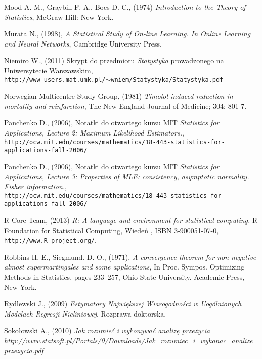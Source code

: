 \begin{thebibliography}{99}
 Mood A. M., Graybill F. A., Boes D. C., (1974) \textit{Introduction to the Theory of Statistics},
McGraw-Hill: New York.

 Murata N., (1998), \textit{A Statistical Study of On-line Learning. In Online Learning
and Neural Networks}, Cambridge University Press.

 Niemiro W., (2011) Skrypt do przedmiotu \textit{Statystyka} prowadzonego na Uniwersytecie Warszawskim, \\ \texttt{http://www-users.mat.umk.pl/$\sim$wniem/Statystyka/Statystyka.pdf}

 Norwegian Multicentre Study Group, (1981) \textit{Timolol-induced reduction in
mortality and reinfarction}, The New England  Journal of Medicine; 304: 801-7.


 Panchenko D., (2006), Notatki do otwartego kursu MIT \textit{Statistics for Applications, Lecture 2: Maximum Likelihood Estimators.}, \\
\texttt{http://ocw.mit.edu/courses/mathematics/18-443-statistics-for-applications-fall-2006/}



 Panchenko D., (2006), Notatki do otwartego kursu MIT \textit{Statistics for Applications, Lecture 3: Properties of MLE: consistency, asymptotic normality. Fisher information.}, \\
\texttt{http://ocw.mit.edu/courses/mathematics/18-443-statistics-for-applications-fall-2006/}



 R Core Team, (2013) \textit{R: A language and environment for statistical computing.} R Foundation for Statistical Computing, Wiedeń , ISBN 3-900051-07-0, \texttt{http://www.R-project.org/}.


 Robbins H. E., Siegmund. D. O., (1971), \textit{A convergence theorem for non negative almost supermartingales
and some applications}, In Proc. Sympos. Optimizing
Methods in Statistics, pages 233–257, Ohio State
University. Academic Press, New York.

 Rydlewski J., (2009) \textit{Estymatory Największej Wiarogodności w Uogólnionych Modelach Regresji Nieliniowej}, Rozprawa doktorska.

 Sokołowski A., (2010) \textit{Jak rozumieć i wykonywać analizę przeżycia} \textit{http://www.statsoft.pl/Portals/0/Downloads/Jak\_rozumiec\_i\_wykonac\_analize\_przezycia.pdf}


\end{thebibliography}
